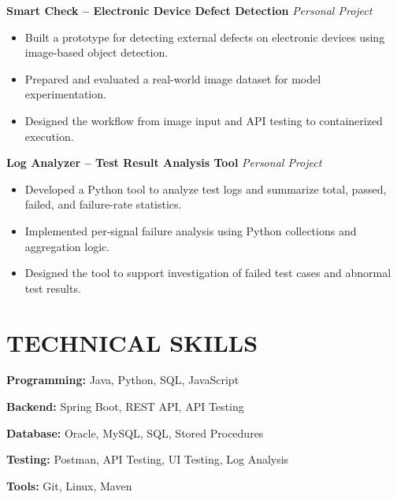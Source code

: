 \documentclass[10pt,a4paper]{article}
\begin{document}
\textbf{Smart Check -- Electronic Device Defect Detection}
\hfill \textit{Personal Project}

\begin{itemize}
    \item Built a prototype for detecting external defects on
    electronic devices using image-based object detection.

    \item Prepared and evaluated a real-world image dataset for
    model experimentation.

    \item Designed the workflow from image input and API testing
    to containerized execution.
\end{itemize}

\textbf{Log Analyzer -- Test Result Analysis Tool}
\hfill \textit{Personal Project}

\begin{itemize}
    \item Developed a Python tool to analyze test logs and summarize
    total, passed, failed, and failure-rate statistics.

    \item Implemented per-signal failure analysis using Python
    collections and aggregation logic.

    \item Designed the tool to support investigation of failed
    test cases and abnormal test results.
\end{itemize}


\section{TECHNICAL SKILLS}

\textbf{Programming:}
Java, Python, SQL, JavaScript

\textbf{Backend:}
Spring Boot, REST API, API Testing

\textbf{Database:}
Oracle, MySQL, SQL, Stored Procedures

\textbf{Testing:}
Postman, API Testing, UI Testing, Log Analysis

\textbf{Tools:}
Git, Linux, Maven

\end{document}
